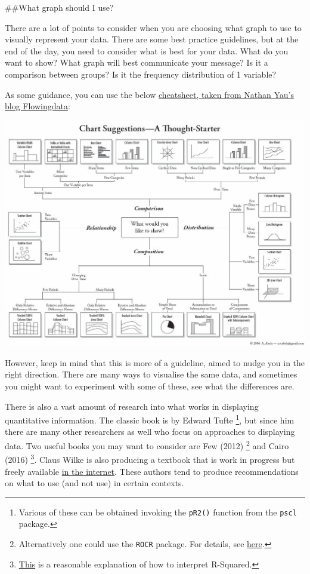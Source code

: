 \documentclass[]{book}
\let\rmarkdownfootnote\footnote%
\def\footnote{\protect\rmarkdownfootnote}
\theoremstyle{definition}
\theoremstyle{definition}
\theoremstyle{definition}
\theoremstyle{remark}
\begin{document}
\#\#What graph should I use?

There are a lot of points to consider when you are choosing what graph
to use to visually represent your data. There are some best practice
guidelines, but at the end of the day, you need to consider what is best
for your data. What do you want to show? What graph will best
communicate your message? Is it a comparison between groups? Is it the
frequency distribution of 1 variable?

As some guidance, you can use the below
\href{https://flowingdata.com/2009/01/15/flow-chart-shows-you-what-chart-to-use/}{cheatsheet,
taken from Nathan Yau's blog Flowingdata}:

\includegraphics{imgs/chart-chart.jpg}

However, keep in mind that this is more of a guideline, aimed to nudge
you in the right direction. There are many ways to visualise the same
data, and sometimes you might want to experiment with some of these, see
what the differences are.

There is also a vast amount of research into what works in displaying
quantitative information. The classic book is by Edward Tufte \footnote{Various
  of these can be obtained invoking the \texttt{pR2()} function from the
  \texttt{pscl} package.}, but since him there are many other
researchers as well who focus on approaches to displaying data. Two
useful books you may want to consider are Few (2012) \footnote{Alternatively
  one could use the \texttt{ROCR} package. For details, see
  \href{http://rocr.bioinf.mpi-sb.mpg.de/}{here}.} and Cairo (2016)
\footnote{\href{http://blog.minitab.com/blog/adventures-in-statistics/regression-analysis-how-do-i-interpret-r-squared-and-assess-the-goodness-of-fit}{This}
  is a reasonable explanation of how to interpret R-Squared.}. Claus
Wilke is also producing a textbook that is work in progress but freely
available \href{https://serialmentor.com/dataviz/}{in the internet}.
These authors tend to produce recommendations on what to use (and not
use) in certain contexts.
\end{document}
